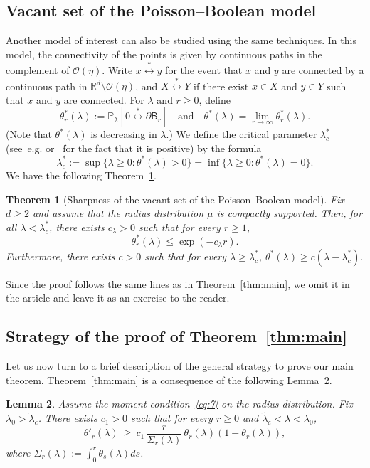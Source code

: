 \documentclass[10pt]{amsart}
\newtheorem{theo}{Theorem}[section]
\newtheorem{lemm}[theo]{Lemma}\newtheorem{prop}[theo]{Proposition}\newtheorem{coro}[theo]{Corollary}\newtheorem{conj}[theo]{Conjecture}
\theoremstyle{definition}\newtheorem{defi}[theo]{Definition}\newtheorem{rema}[theo]{Remark}\newtheorem{exam}[theo]{Example}\newtheorem{exem}[theo]{Example}\newtheorem{nota}[theo]{Notation}
\begin{document}
\subsection{Vacant set of the Poisson--Boolean model}
Another model of interest can also be studied using the same techniques. In this model, the connectivity of the points is given by continuous paths in the complement of ${\mathcal O}(\eta)$. Write $x\stackrel{*}{\longleftrightarrow}y$ for the event that $x$ and $y$ are connected by a continuous path in ${\mathbb R}^d\setminus{\mathcal O}(\eta)$, and $X\stackrel{*}{\longleftrightarrow}Y$ if there exist $x\in X $ and $y\in Y$ such that $x$ and $y$ are connected. For $\lambda$ and $r\ge0$, define
\[
\theta_r^*(\lambda):={\mathbb P}_\lambda[0\stackrel{*}\longleftrightarrow \partial\mathsf B_r]\quad\text{and}\quad\theta^*(\lambda)=\lim_{r\rightarrow\infty}\theta_r^*(\lambda).
\]
(Note that $\theta^*(\lambda)$ is decreasing in $\lambda$.) We define the critical parameter $\lambda_c^*$ (see~e.g. \cite{Pen17} or~\cite{ATT17} for the fact that it is positive) by the formula
\[
\lambda_c^*:=\sup\{\lambda\ge 0:\theta^*(\lambda)>0\}=\inf\{\lambda\ge 0:\theta^*(\lambda)=0\}.
\]
We have the following Theorem~\ref{theo1.6}.
\begin{theo}[Sharpness of the vacant set of the Poisson--Boolean model]\label{theo1.6}
Fix $d\ge2$ and assume that the radius distribution $\mu$ is compactly supported. Then, for all $\lambda < \lambda_c^*$, there exists $c_\lambda >0$ such that for every $r\ge1$,
\[
\theta_r^*(\lambda) \leq \exp (-c_\lambda r).
\]
Furthermore, there exists $c>0$ such that for every $\lambda\ge\lambda_c^*$, $\theta^*(\lambda)\ge c(\lambda-\lambda_c^*).$
\end{theo}
Since the proof follows the same lines as in Theorem~\ref{thm:main}, we omit it in the article and leave it as an exercise to the reader.

\subsection{Strategy of the proof of Theorem~\ref{thm:main}}
Let us now turn to a brief description of the general strategy to prove our main theorem. Theorem~\ref{thm:main} is a consequence of the following Lemma~\ref{lem:mlem}.

\begin{lemm}\label{lem:mlem}
Assume the moment condition~\eqref{eq:7} on the radius distribution. Fix $\lambda_0 > \widetilde\lambda_c$. There exists $c_1>0$ such that for every $r\geq 0$ and $\widetilde\lambda_c < \lambda < \lambda_0$,
\begin{equation}\label{eq:mlem}
{\theta'_r}(\lambda)~\geq~c_1 \, {\frac{r}{{\Sigma_r(\lambda)}}} \, \theta_r(\lambda)(1 - \theta_r(\lambda)),
\end{equation}
where $\Sigma_r(\lambda):= \int_0^r \theta_s(\lambda)ds$.
\end{lemm}
\end{document}
